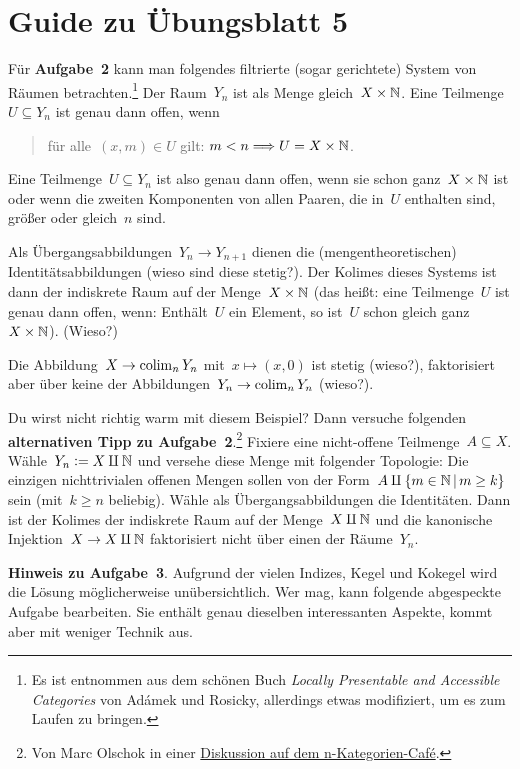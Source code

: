 \documentclass{uebblatt}
\begin{document}
\section*{Guide zu Übungsblatt 5}

Für \textbf{Aufgabe~2} kann man folgendes filtrierte (sogar gerichtete) System
von Räumen betrachten.\footnote{Es ist entnommen aus dem schönen Buch
\emph{Locally Presentable and Accessible Categories} von Adámek und Rosicky,
allerdings etwas modifiziert, um es zum Laufen zu bringen.}
Der Raum~$Y_n$ ist als Menge gleich~$X \times \mathbb{N}$. Eine
Teilmenge~$U \subseteq Y_n$ ist genau dann offen, wenn
\begin{quote}
für alle~$(x,m) \in U$ gilt: $m < n \Longrightarrow U = X \times \mathbb{N}$.
\end{quote}
Eine Teilmenge~$U \subseteq Y_n$ ist also genau dann offen, wenn sie schon
ganz~$X \times \mathbb{N}$ ist oder wenn die zweiten Komponenten von allen Paaren,
die in~$U$ enthalten sind, größer oder gleich~$n$ sind.

Als Übergangsabbildungen~$Y_n \to Y_{n+1}$ dienen die (mengentheoretischen)
Iden\-ti\-täts\-ab\-bil\-dun\-gen (wieso sind diese stetig?). Der Kolimes dieses Systems
ist dann der indiskrete Raum auf der Menge~$X \times \mathbb{N}$ (das heißt: eine
Teilmenge~$U$ ist genau dann offen, wenn: Enthält~$U$ ein Element, so ist~$U$
schon gleich ganz~$X \times \mathbb{N}$). (Wieso?)

Die Abbildung~$X \to \operatorname*{colim}_n Y_n$ mit~$x \mapsto (x,0)$ ist stetig (wieso?),
faktorisiert aber über keine der Abbildungen~$Y_n \to \operatorname*{colim}_n Y_n$ (wieso?).

Du wirst nicht richtig warm mit diesem Beispiel? Dann versuche folgenden
\textbf{alternativen Tipp zu Aufgabe~2}.\footnote{Von Marc Olschok in einer
\href{https://golem.ph.utexas.edu/category/2009/05/journal_club_geometric_infinit_3.html\#c023818}{Diskussion
auf dem n-Kategorien-Café}.}
Fixiere eine nicht-offene Teilmenge~$A \subseteq X$. Wähle~$Y_n \vcentcolon= X \amalg
\mathbb{N}$ und versehe diese Menge mit folgender Topologie: Die einzigen
nichttrivialen offenen Mengen sollen von der Form~$A \amalg \{ m \in \mathbb{N} \,|\,
m \geq k \}$ sein (mit~$k \geq n$ beliebig). Wähle als Übergangsabbildungen
die Identitäten. Dann ist der Kolimes der indiskrete Raum auf der Menge~$X
\amalg \mathbb{N}$ und die kanonische Injektion~$X \to X \amalg \mathbb{N}$ faktorisiert
nicht über einen der Räume~$Y_n$.

\textbf{Hinweis zu Aufgabe~3}. Aufgrund der vielen Indizes, Kegel und Kokegel
wird die Lösung möglicherweise unübersichtlich. Wer mag, kann folgende
abgespeckte Aufgabe bearbeiten. Sie enthält genau dieselben interessanten
Aspekte, kommt aber mit weniger Technik aus.
\end{document}
